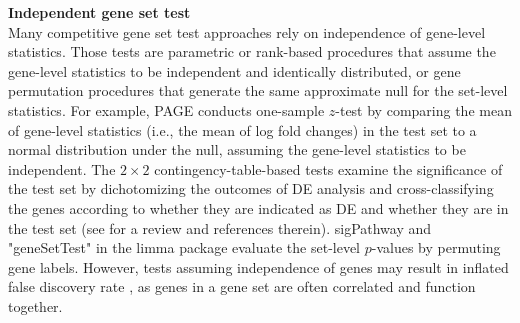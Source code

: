 \documentclass[useAMS,usenatbib, galley]{biom}
\newcommand{\gen}{geneSetTest}
\begin{document}
	
	\textbf{Independent gene set test} \\
	Many competitive gene set test approaches rely on independence of gene-level statistics. Those tests are parametric or rank-based procedures that assume the gene-level statistics to be independent and identically distributed, or gene permutation procedures that generate the same approximate null for the set-level statistics. For example, PAGE  \citep{kim2005page} conducts one-sample $z$-test by comparing the mean of gene-level statistics (i.e., the mean of log fold changes) in the test set to a normal distribution under the null, assuming the  gene-level statistics to be independent. The $2\times 2$ contingency-table-based tests examine the significance of the test set by dichotomizing the outcomes of DE analysis and cross-classifying the genes according to whether they are indicated as DE and whether they are in the test set (see \cite{huang2009bioinformatics} for a review and references therein). sigPathway \citep{tian2005discovering} and "\gen" in the limma package \citep{Smyth2004moderated} evaluate the set-level $p$-values by permuting gene labels. However, tests assuming independence of genes may result in inflated false discovery rate \citep{efron2007testing,goeman2007analyzing, gatti2010heading,wu2012camera,yaari2013quantitative},
	as genes in a gene set are often correlated and function together.
	
\end{document}
